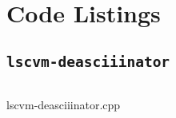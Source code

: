\documentclass[12pt]{article}
\begin{document}
\section{Code Listings}

	\subsection{\texttt{lscvm-deasciiinator}}
		\vspace{\baselineskip}
		\begin{multipagecode}
			\inputminted[xleftmargin=0.075\textwidth,xrightmargin=0.075\textwidth,frame=leftline,framesep=4mm,framerule=0.4mm,
	linenos=true]{cpp}{../lscvm/lscvm-deasciiinator.cpp}
			\caption{lscvm-deasciiinator.cpp}
			\label{code:lscvm-deasciiinator}
		\end{multipagecode}
\end{document}
